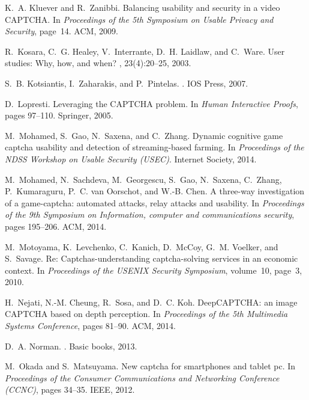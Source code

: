 \documentclass[conference]{IEEEtran}
\begin{document}
\begin{thebibliography}{10}
K.~A. Kluever and R.~Zanibbi.
\newblock Balancing usability and security in a video {CAPTCHA}.
\newblock In {\em Proceedings of the 5th Symposium on Usable Privacy and
  Security}, page~14. ACM, 2009.

R.~Kosara, C.~G. Healey, V.~Interrante, D.~H. Laidlaw, and C.~Ware.
\newblock User studies: Why, how, and when?
, 23(4):20--25, 2003.

S.~B. Kotsiantis, I.~Zaharakis, and P.~Pintelas.
.
\newblock IOS Press, 2007.

D.~Lopresti.
\newblock Leveraging the {CAPTCHA} problem.
\newblock In {\em Human Interactive Proofs}, pages 97--110. Springer, 2005.

M.~Mohamed, S.~Gao, N.~Saxena, and C.~Zhang.
\newblock Dynamic cognitive game captcha usability and detection of
  streaming-based farming.
\newblock In {\em Proceedings of the NDSS Workshop on Usable Security (USEC)}.
  Internet Society, 2014.

M.~Mohamed, N.~Sachdeva, M.~Georgescu, S.~Gao, N.~Saxena, C.~Zhang,
  P.~Kumaraguru, P.~C. van Oorschot, and W.-B. Chen.
\newblock A three-way investigation of a game-captcha: automated attacks, relay
  attacks and usability.
\newblock In {\em Proceedings of the 9th Symposium on Information, computer and
  communications security}, pages 195--206. ACM, 2014.

M.~Motoyama, K.~Levchenko, C.~Kanich, D.~McCoy, G.~M. Voelker, and S.~Savage.
\newblock Re: Captchas-understanding captcha-solving services in an economic
  context.
\newblock In {\em Proceedings of the USENIX Security Symposium}, volume~10,
  page~3, 2010.

H.~Nejati, N.-M. Cheung, R.~Sosa, and D.~C. Koh.
\newblock Deep{CAPTCHA}: an image {CAPTCHA} based on depth perception.
\newblock In {\em Proceedings of the 5th Multimedia Systems Conference}, pages
  81--90. ACM, 2014.

D.~A. Norman.
.
\newblock Basic books, 2013.

M.~Okada and S.~Matsuyama.
\newblock New captcha for smartphones and tablet pc.
\newblock In {\em Proceedings of the Consumer Communications and Networking
  Conference (CCNC)}, pages 34--35. IEEE, 2012.


\end{thebibliography}
\end{document}
